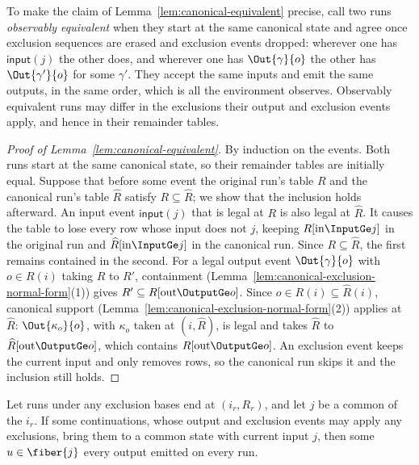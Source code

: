 To make the claim of Lemma~\ref{lem:canonical-equivalent} precise, call two
runs \emph{observably equivalent} when they start at the same canonical state and agree once exclusion sequences are erased and exclusion events dropped:
wherever one has $\mathsf{input}(j)$ the other does, and wherever one has
$\Out{\gamma}{o}$ the other has $\Out{\gamma'}{o}$ for some $\gamma'$.  They accept the same inputs and emit
the same outputs, in the same order, which is all the environment observes.
Observably equivalent runs may differ in the exclusions their output and exclusion events apply, and
hence in their remainder tables.

\begin{proof}[Proof of Lemma~\ref{lem:canonical-equivalent}]
By induction on the events.  Both runs start at the same canonical state, so
their remainder tables are initially equal.  Suppose that before some event the
original run's table $R$ and the canonical run's table $\widehat R$ satisfy
$R\subseteq\widehat R$; we show that the inclusion holds afterward.  An input
event $\mathsf{input}(j)$ that is legal at $R$ is also legal at $\widehat R$.
It causes the table to lose every row whose input does not \inrelbase $j$, keeping
$R[\mathrm{in}\InputGe j]$ in the original run and
$\widehat R[\mathrm{in}\InputGe j]$ in the canonical run.  Since
$R\subseteq\widehat R$, the first remains contained in the second.  For a legal
output event $\Out{\gamma}{o}$ with $o\in R(i)$ taking $R$ to $R'$, containment
(Lemma~\ref{lem:canonical-exclusion-normal-form}(1)) gives
$R'\subseteq R[\mathrm{out}\OutputGe o]$.  Since
$o\in R(i)\subseteq\widehat R(i)$, canonical support
(Lemma~\ref{lem:canonical-exclusion-normal-form}(2)) applies at $\widehat R$:
$\Out{\kappa_o}{o}$, with $\kappa_o$ taken at $(i,\widehat R)$, is legal and
takes $\widehat R$ to $\widehat R[\mathrm{out}\OutputGe o]$, which contains
$R[\mathrm{out}\OutputGe o]$.  An exclusion event keeps the current input and
only removes rows, so the canonical run skips it and the inclusion still
holds.
\end{proof}

\begin{corollary}
\label{cor:reconciliation-any-basis}
Let runs under any exclusion bases end at $(i_r,R_r)$, and let $j$ be a
common \indesc of the $i_r$.  If some continuations, whose output and exclusion events
may apply any exclusions, bring them to a common state with current input $j$,
then some $u\in\fiber{j}$ \outrel every output emitted on every run.
\end{corollary}

